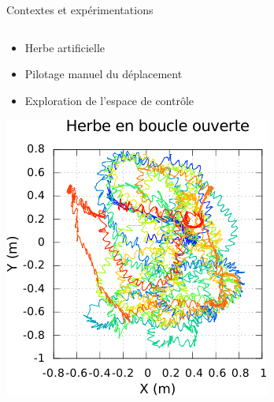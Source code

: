 \begin{frame}{Contextes et expérimentations}
    \begin{columns}
        \begin{column}{0.5\linewidth}
            \vspace{1.0em}
            \begin{itemize}
                \item Herbe artificielle
                \item Pilotage manuel du déplacement
                \item Exploration de l'espace de contrôle
            \end{itemize}
            \vspace{2.0em}
            \centering
            \includegraphics[type=pdf,ext=.pdf,read=.pdf,width=0.8\linewidth]{../plot/OdometryLWPR/grass_open_learn_log_complete_traj}
        \end{column}
        \begin{column}{0.5\linewidth}
            \centering
        \end{column}
    \end{columns}
\end{frame}

